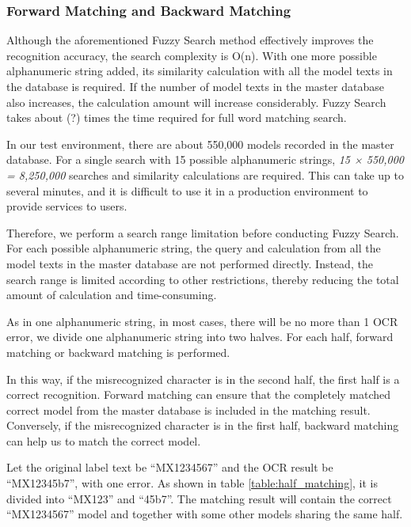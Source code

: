 \documentclass[technicalreport]{ieicej}
\begin{document}
        \subsubsection{Forward Matching and Backward Matching}
            Although the aforementioned Fuzzy Search method effectively improves the recognition accuracy, the search complexity is O(n). With one more possible alphanumeric string added, its similarity calculation with all the model texts in the database is required. If the number of model texts in the master database also increases, the calculation amount will increase considerably. Fuzzy Search takes about (?) times the time required for full word matching search.
            
            In our test environment, there are about 550,000 models recorded in the master database. For a single search with 15 possible alphanumeric strings, {\em 15 × 550,000 = 8,250,000} searches and similarity calculations are required. This can take up to several minutes, and it is difficult to use it in a production environment to provide services to users.
            
            Therefore, we perform a search range limitation before conducting Fuzzy Search. For each possible alphanumeric string, the query and calculation from all the model texts in the master database are not performed directly. Instead, the search range is limited according to other restrictions, thereby reducing the total amount of calculation and time-consuming.
            
            As in one alphanumeric string, in most cases, there will be no more than 1 OCR error, we divide one alphanumeric string into two halves. For each half, forward matching or backward matching is performed.
            
            In this way, if the misrecognized character is in the second half, the first half is a correct recognition. Forward matching can ensure that the completely matched correct model from the master database is included in the matching result. Conversely, if the misrecognized character is in the first half, backward matching can help us to match the correct model.
            
            Let the original label text be “MX1234567” and the OCR result be “MX12345b7”, with one error. As shown in table \ref{table:half_matching}, it is divided into “MX123” and “45b7”. The matching result will contain the correct “MX1234567” model and together with some other models sharing the same half.
\end{document}
